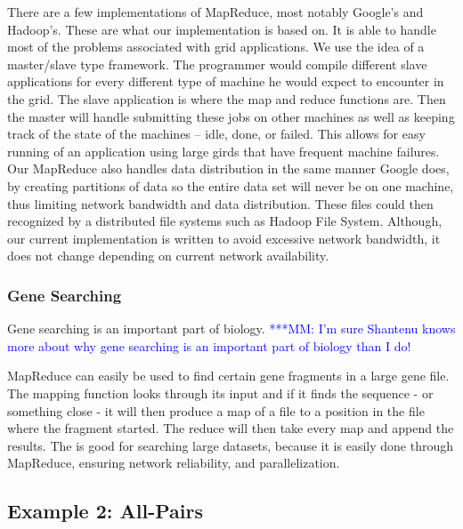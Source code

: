\documentclass[conference,final]{IEEEtran}
\newcommand{\michaelnote}[1]{ {\textcolor{blue} { ***MM: #1 }}}
\newcommand{\michaelnote}[1]{ {\textcolor{blue} { ***MM: #1 }}}
\begin{document}
There are a few implementations of MapReduce, most notably Google's and
Hadoop's.  These are what our implementation is based on.  It is able
to handle most of the problems associated with grid applications.  We use
the idea of a master/slave type framework.  The programmer would compile
different slave applications for every different type of machine he 
would expect to encounter in the grid.  The slave application is
where the map and reduce functions are.  Then the master will handle
submitting these jobs on other machines as well as keeping track of
the state of the machines -- idle, done, or failed.  This allows for
easy running of an application using large girds that have frequent
machine failures.  Our MapReduce also handles data distribution in the
same manner Google does, by creating partitions of data so the entire
data set will never be on one machine, thus limiting network bandwidth
and data distribution.  These files could then recognized by a
distributed file systems such as Hadoop File System.  Although, our
current implementation is written to avoid excessive network
bandwidth, it does not change depending on current network
availability.

\subsubsection{Gene Searching}

Gene searching is an important part of biology.
\michaelnote{I'm sure Shantenu knows more about why gene searching is 
an important part of biology than I do!}

MapReduce can easily be used to find certain gene fragments in a large gene 
file.  The mapping function looks through its input and if it finds the 
sequence - or something close - it will then produce a map of a file to a 
position in the file where the fragment started.  The reduce will then take 
every map and append the results.  The is good for searching large datasets, 
because it is easily done through MapReduce, ensuring network reliability, and 
parallelization.  

\subsection{Example 2: All-Pairs}
\end{document}
